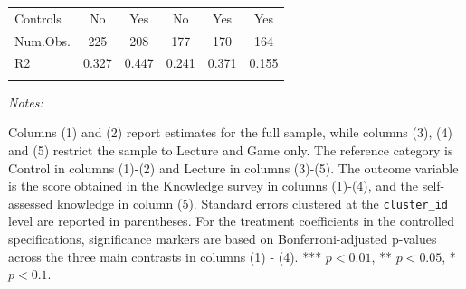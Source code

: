 \begin{table}[htbp]
\begin{tabular}{lccccc}
Controls & No & Yes & No & Yes & Yes \\
Num.Obs. & \num{225} & \num{208} & \num{177} & \num{170} & \num{164} \\
R2 & \num{0.327} & \num{0.447} & \num{0.241} & \num{0.371} & \num{0.155} \\
\\
\bottomrule
\hline
\hline
\end{tabular}
{\begin{flushleft}\parbox{\textwidth}{\tiny \hspace*{0.1cm}
\textit{Notes:}} Columns (1) and (2) report estimates for the full sample, while columns (3), (4) and (5) restrict the sample to Lecture and Game only. The reference category is Control in columns (1)-(2) and Lecture in columns (3)-(5). The outcome variable is the score obtained in the Knowledge survey in columns (1)-(4), and the self-assessed knowledge in column (5). Standard errors clustered at the \texttt{cluster\_id} level are reported in parentheses. For the treatment coefficients in the controlled specifications, significance markers are based on Bonferroni-adjusted p-values across the three main contrasts in columns (1) - (4). *** $p < 0.01$, ** $p < 0.05$, * $p < 0.1$.
\end{flushleft}}
\end{table}
